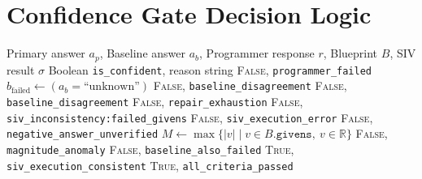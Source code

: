 \documentclass[11pt,a4paper]{article}
\begin{document}
\section{Confidence Gate Decision Logic}
\label{app:gate}
\begin{algorithm}[H]
\caption{Confidence Gate (v12.0). Baseline disagreement is checked \emph{before} any SIV-driven skip (v10.1 ordering invariant); a negative answer triggers SHT only when no baseline cross-check exists (v12).}
\label{alg:gate}
\begin{algorithmic}[1]
\Require Primary answer $a_p$, Baseline answer $a_b$, Programmer response $r$, Blueprint $B$, SIV result $\sigma$
\Ensure Boolean \texttt{is\_confident}, reason string
    \State \Return \textsc{False}, \texttt{programmer\_failed}
\EndIf
\State $b_{\text{failed}} \gets (a_b = \text{``unknown''})$
        \State \Return \textsc{False}, \texttt{baseline\_disagreement}
        \State \Return \textsc{False}, \texttt{baseline\_disagreement}
    \EndIf
\EndIf
{}
    \State \Return \textsc{False}, \texttt{repair\_exhaustion}
\EndIf
{}
        \State \Return \textsc{False}, \texttt{siv\_inconsistency:}\texttt{failed\_givens}
        \State \Return \textsc{False}, \texttt{siv\_execution\_error}
    \EndIf
\EndIf
{}
    \State \Return \textsc{False}, \texttt{negative\_answer\_unverified}
\EndIf
\State $M \gets \max\{|v| \mid v \in B.\texttt{givens},\ v \in \mathbb{R}\}$
    \State \Return \textsc{False}, \texttt{magnitude\_anomaly}
\EndIf
{}
    \State \Return \textsc{False}, \texttt{baseline\_also\_failed}
\EndIf
{}
    \State \Return \textsc{True}, \texttt{siv\_execution\_consistent}
\EndIf
\State \Return \textsc{True}, \texttt{all\_criteria\_passed}
\end{algorithmic}
\end{algorithm}
\end{document}
